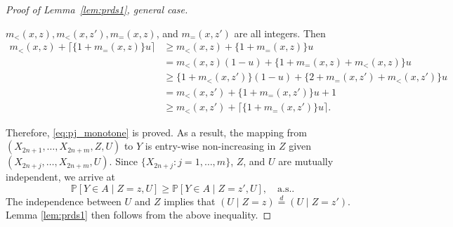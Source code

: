 \documentclass[11pt]{article}
\renewcommand{\P}{\mathbb{P}}
\begin{document}
\begin{proof}[Proof of Lemma~\ref{lem:prds1}, general case]
\begin{enumerate}[{Case} 1: ]
$m_{<}(x, z), m_{<}(x, z'), m_{=}(x, z)$, and $m_{=}(x, z')$ are all integers. Then
\begin{align*}
 m_{<}(x, z) + \lceil \{1 + m_{=}(x, z)\}u\rceil
&\ge m_{<}(x, z) + \{1 + m_{=}(x, z)\}u \\
&= m_{<}(x, z)(1 - u) + \{1 + m_{=}(x, z) + m_{<}(x, z)\}u\\
&\ge \{1 + m_{<}(x, z')\}(1 - u) + \{2 + m_{=}(x, z') + m_{<}(x, z')\}u\\
& = m_{<}(x, z') + \{1 + m_{=}(x, z')\}u + 1\\
& \ge m_{<}(x, z') + \lceil\{1 + m_{=}(x, z')\}u\rceil.
\end{align*}
\end{enumerate}
Therefore, \eqref{eq:pj_monotone} is proved. As a result, the mapping from $(X_{2n+1}, \ldots, X_{2n+m}, Z, U)$ to $Y$ is entry-wise non-increasing in $Z$ given $(X_{2n+j}, \ldots, X_{2n+m}, U)$. Since $\{X_{2n+j}: j = 1,\ldots,m\}$, $Z$, and $U$ are mutually independent, we arrive at
\[\P[Y\in A \mid Z = z, U]\ge \P[Y\in A \mid Z = z', U], \quad \text{a.s.}.\]
The independence between $U$ and $Z$ implies that $(U\mid Z = z) \stackrel{d}{=} (U\mid Z = z')$.  Lemma \ref{lem:prds1} then follows from the above inequality.
\end{proof}
\end{document}

